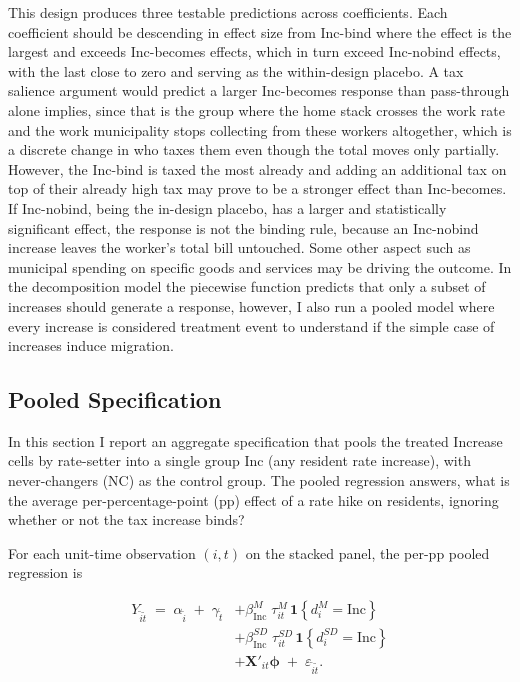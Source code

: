 \documentclass[12pt]{article}
\begin{document}
This design produces three testable predictions across coefficients. Each coefficient should be descending in effect size from Inc-bind where the effect is the largest and exceeds
Inc-becomes effects, which in turn exceed Inc-nobind effects, with
the last close to zero and serving as the
within-design placebo. A tax salience argument would predict a larger
Inc-becomes response than pass-through alone implies, since that is the
group where the home stack crosses the work rate and the work
municipality stops collecting from these workers altogether, which is a
discrete change in who taxes them even though the total moves only
partially. However, the Inc-bind is taxed the most already and adding an additional tax on top of their already high tax may prove to be a stronger effect than Inc-becomes. If Inc-nobind, being the in-design placebo, has a larger and statistically significant effect, the response is not the binding
rule, because an Inc-nobind increase leaves the worker's total bill
untouched. Some other aspect such as municipal spending on specific goods and services may be driving the outcome. In the decomposition model the piecewise function predicts that only a subset of
increases should generate a response, however, I also run a pooled model where every increase is considered treatment event to understand if the simple case of increases induce migration.

\subsection{Pooled Specification}
\label{subsec:pooled-spec}

In this section I report an aggregate specification that pools the
treated Increase cells by rate-setter into a single group
$\text{Inc}$ (any resident rate increase), with never-changers (NC) as the control group. The pooled
regression answers, what is the average per-percentage-point (pp)
effect of a rate hike on residents, ignoring whether or not the
tax increase binds?

For each unit-time observation $(i, t)$ on the stacked panel, the
per-pp pooled regression is

\begin{equation}
\begin{split}
Y_{\tilde i \tilde t} \;=\; \alpha_{\tilde i} \;+\; \gamma_{\tilde t}
&+ \beta^{M}_{\text{Inc}}\;\tau^{M}_{it}\,\mathbf{1}\!\left\{d^{M}_{i} = \text{Inc}\right\} \\
&+ \beta^{SD}_{\text{Inc}}\;\tau^{SD}_{it}\,\mathbf{1}\!\left\{d^{SD}_{i} = \text{Inc}\right\} \\
&+ \mathbf{X}'_{it}\boldsymbol{\phi}
\;+\; \varepsilon_{\tilde i \tilde t}.
\end{split}
\label{eq:pooled}
\end{equation}
\end{document}
